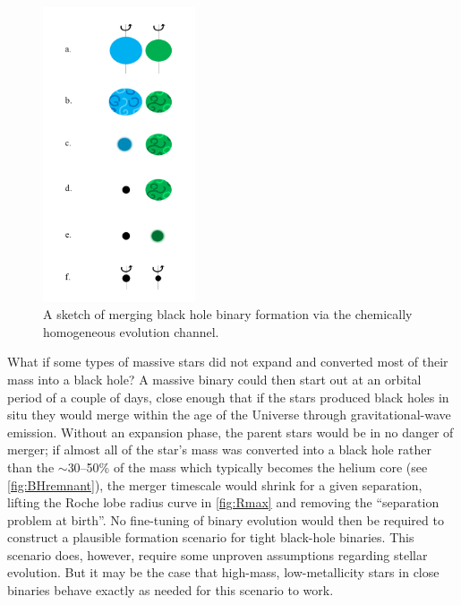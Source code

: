 \documentclass[iop,onecolumn]{revtex4-1}
\begin{document}
\begin{figure}
	\centering
	\includegraphics[width=0.4\textwidth]{channel2.png}
	\caption{\label{fig:chem_homog} A sketch of merging black hole binary formation via the chemically homogeneous evolution channel.}
\end{figure}

What if some types of massive stars did not expand and converted most of their mass into a black hole? A massive binary could then start out at an orbital period of a couple of days, close enough that if the stars produced black holes in situ they would merge within the age of the Universe through gravitational-wave emission. Without an expansion phase, the parent stars would be in no danger of merger; if almost all of the star's mass was converted into a black hole rather than the $\sim$30--50\% of the mass which typically becomes the helium core (see \autoref{fig:BHremnant}), the merger timescale would shrink for a given separation, lifting the Roche lobe radius curve in \autoref{fig:Rmax} and removing the ``separation problem at birth''.  No fine-tuning of binary evolution would then be required to construct a plausible formation scenario for tight black-hole binaries.  This scenario does, however, require some unproven assumptions regarding stellar evolution. But it may be the case that high-mass, low-metallicity stars in close binaries behave exactly as needed for this scenario to work.
\end{document}
